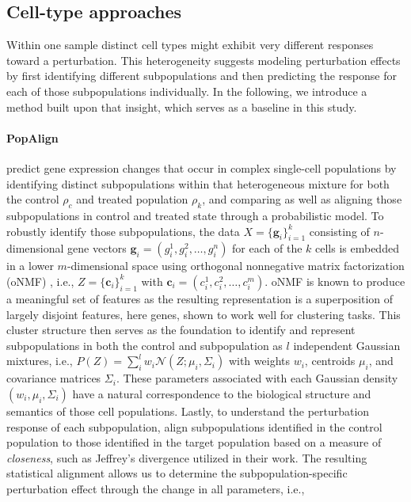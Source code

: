 \subsection{Cell-type approaches}  %
Within one sample distinct cell types might exhibit very different responses toward a perturbation.
This heterogeneity suggests modeling perturbation effects by first identifying different subpopulations and then predicting the response for each of those subpopulations individually.
In the following, we introduce a method built upon that insight, which serves as a baseline in this study.

\paragraph{PopAlign}
\citet{chen2020} predict gene expression changes that occur in complex single-cell populations by identifying distinct subpopulations within that heterogeneous mixture for both the control $\rho_c$ and treated population $\rho_k$, and comparing as well as aligning those subpopulations in control and treated state through a probabilistic model.
To robustly identify those subpopulations, the data $X = \{ \mathbf{g}_i \}_{i=1}^k$ consisting of $n$-dimensional gene vectors $\mathbf{g}_i = (g_i^1, g_i^2, \dots, g_i^n)$ for each of the $k$ cells is embedded in a lower $m$-dimensional space using orthogonal nonnegative matrix factorization (oNMF) \citep{asteris2015}, i.e., $Z = \{ \mathbf{c}_i \}_{i=1}^k$ with $\mathbf{c}_i = (c_i^1, c_i^2, \dots, c_i^m)$. oNMF is known to produce a meaningful set of features as the resulting representation is a superposition of largely disjoint features, here genes, shown to work well for clustering tasks.
This cluster structure then serves as the foundation to identify and represent subpopulations in both the control and subpopulation as $l$ independent Gaussian mixtures, i.e., $P(Z) = \sum_i^l w_i \mathcal{N}(Z; \mu_i, \Sigma_i)$ with weights $w_i$, centroids $\mu_i$, and covariance matrices $\Sigma_i$.
These parameters associated with each Gaussian density $(w_i, \mu_i, \Sigma_i)$ have a natural correspondence to the biological structure and semantics of those cell populations.
Lastly, to understand the perturbation response of each subpopulation, \citet{chen2020} align subpopulations identified in the control population to those identified in the target population based on a measure of \emph{closeness}, such as Jeffrey's divergence utilized in their work. The resulting statistical alignment allows us to determine the subpopulation-specific perturbation effect through the change in all parameters, i.e.,
